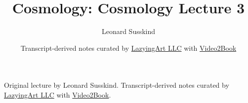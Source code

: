 \documentclass[11pt,oneside]{book}
\begin{document}
\frontmatter
\title{Cosmology: Cosmology Lecture 3}
\author{Leonard Susskind}
\date{Transcript-derived notes curated by \href{https://lazying.art}{LazyingArt LLC} with \href{https://github.com/lachlanchen/Video2Book}{Video2Book}}
\maketitle
\begin{center}
\small Original lecture by Leonard Susskind. Transcript-derived notes curated by \href{https://lazying.art}{LazyingArt LLC} with \href{https://github.com/lachlanchen/Video2Book}{Video2Book}.
\end{center}
\clearpage
\mainmatter

\end{document}
